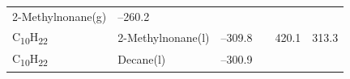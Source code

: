 \documentclass[
]{book}
\theoremstyle{definition}
\theoremstyle{definition}
\theoremstyle{definition}
\theoremstyle{remark}
\begin{document}
\begin{longtable}[]{@{}llllll@{}}
\begin{minipage}[t]{0.17\columnwidth}
2-Methylnonane(g)\strut
\end{minipage} & \begin{minipage}[t]{0.15\columnwidth}\raggedright
--260.2\strut
\end{minipage} & \begin{minipage}[t]{0.15\columnwidth}\raggedright
\strut
\end{minipage} & \begin{minipage}[t]{0.14\columnwidth}\raggedright
\strut
\end{minipage} & \begin{minipage}[t]{0.14\columnwidth}\raggedright
\strut
\end{minipage}\tabularnewline
\begin{minipage}[t]{0.07\columnwidth}\raggedright
C\textsubscript{10}H\textsubscript{22}\strut
\end{minipage} & \begin{minipage}[t]{0.17\columnwidth}\raggedright
2-Methylnonane(l)\strut
\end{minipage} & \begin{minipage}[t]{0.15\columnwidth}\raggedright
--309.8\strut
\end{minipage} & \begin{minipage}[t]{0.15\columnwidth}\raggedright
\strut
\end{minipage} & \begin{minipage}[t]{0.14\columnwidth}\raggedright
420.1\strut
\end{minipage} & \begin{minipage}[t]{0.14\columnwidth}\raggedright
313.3\strut
\end{minipage}\tabularnewline
\begin{minipage}[t]{0.07\columnwidth}\raggedright
C\textsubscript{10}H\textsubscript{22}\strut
\end{minipage} & \begin{minipage}[t]{0.17\columnwidth}\raggedright
Decane(l)\strut
\end{minipage} & \begin{minipage}[t]{0.15\columnwidth}\raggedright
--300.9\strut
\end{minipage} & \begin{minipage}[t]{0.15\columnwidth}\raggedright
\strut
\end{minipage} & \begin{minipage}[t]{0.14\columnwidth}\raggedright
\strut
\end{minipage} & \begin{minipage}[t]{0.14\columnwidth}\raggedright

\end{minipage}
\end{longtable}
\end{document}

